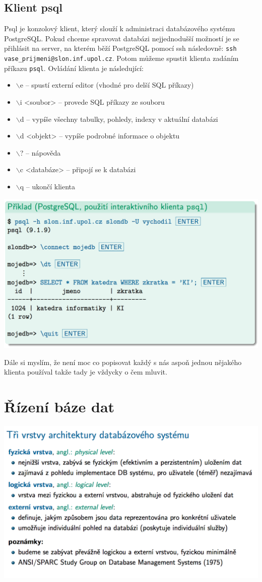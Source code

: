 \documentclass[10pt,a4paper]{article}
\begin{document}
\subsection{Klient psql}
Psql je konzolový klient, který slouží k administraci databázového systému PostgreSQL. Pokud chceme spravovat databázi nejjednodušší možností je se přihlásit na server, na kterém běží PostgreSQL pomocí ssh následovně: \texttt{ssh vase\_prijmeni@slon.inf.upol.cz}. Potom můžeme spustit klienta zadáním příkazu \texttt{psql}. Ovládání klienta je následující:
\begin{itemize}
	\item $\backslash$e -- spustí externí editor (vhodné pro delší SQL příkazy)
	\item $\backslash$i <soubor> -- provede SQL příkazy ze souboru
	\item $\backslash$d -- vypíše všechny tabulky, pohledy, indexy v aktuální databázi
	\item $\backslash$d <objekt> -- vypíše podrobné informace o objektu
	\item $\backslash$? -- nápověda
	\item $\backslash$c <databáze> -- připojí se k databázi
	\item $\backslash$q -- ukončí klienta
\end{itemize}
\includegraphics[scale=0.4]{img/79}

Dále si myslím, že není moc co popisovat každý s nás aspoň jednou nějakého klienta používal takže tady je vždycky o čem mluvit.

\section{Řízení báze dat}
\includegraphics[scale=0.4]{img/71}
\end{document}
